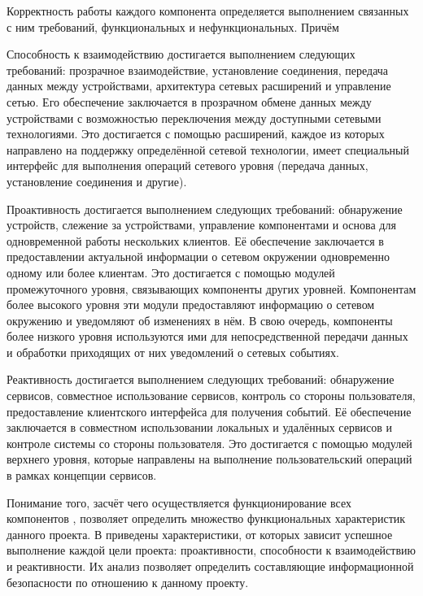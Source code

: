 

%
Корректность работы каждого компонента определяется выполнением связанных с ним требований, функциональных и нефункциональных.
%
Причём 

%
Способность к взаимодействию достигается выполнением следующих требований: прозрачное взаимодействие, установление соединения, передача данных между устройствами, архитектура сетевых расширений и управление сетью. 
%
Его обеспечение заключается в прозрачном обмене данных между устройствами с возможностью переключения между доступными сетевыми технологиями.
%
Это достигается с помощью расширений, каждое из которых направлено на поддержку определённой сетевой технологии, имеет специальный интерфейс для выполнения операций сетевого уровня (передача данных, установление соединения и другие). 

%
Проактивность достигается выполнением следующих требований: обнаружение устройств, слежение за устройствами, управление компонентами и основа для одновременной работы нескольких клиентов.
%
Её обеспечение заключается в предоставлении актуальной информации о сетевом окружении одновременно одному или более клиентам. 
%
Это достигается с помощью модулей промежуточного уровня, связывающих компоненты других уровней. 
%
Компонентам более высокого уровня эти модули предоставляют информацию о сетевом окружению и уведомляют об изменениях в нём. 
%
В свою очередь, компоненты более низкого уровня используются ими для непосредственной передачи данных и обработки приходящих от них уведомлений о сетевых событиях. 

%
Реактивность достигается выполнением следующих требований: обнаружение сервисов, совместное использование сервисов, контроль со стороны пользователя, предоставление клиентского интерфейса для получения событий.
%
Её обеспечение заключается в совместном использовании локальных и удалённых сервисов и контроле системы со стороны пользователя. 
%
Это достигается с помощью модулей верхнего уровня, которые направлены на выполнение пользовательский операций в рамках концепции сервисов. 

%
Понимание того, засчёт чего осуществляется функционирование всех компонентов , позволяет определить множество функциональных характеристик данного проекта. 
%
В  приведены характеристики, от которых зависит успешное выполнение каждой цели проекта: проактивности, способности к взаимодействию и реактивности. 
%
Их анализ позволяет определить составляющие информационной безопасности по отношению к данному проекту. 

